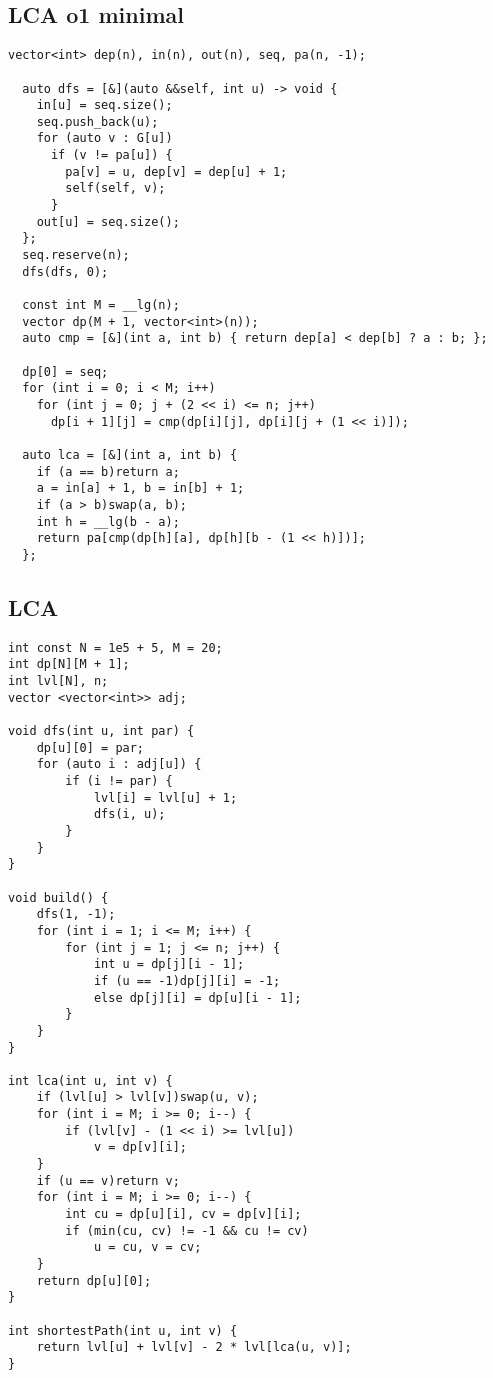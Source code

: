 \subsection{LCA o1 minimal}

\begin{lstlisting}[style=cpp]
  vector<int> dep(n), in(n), out(n), seq, pa(n, -1);

  auto dfs = [&](auto &&self, int u) -> void {
	in[u] = seq.size();
	seq.push_back(u);
	for (auto v : G[u])
	  if (v != pa[u]) {
		pa[v] = u, dep[v] = dep[u] + 1;
		self(self, v);
	  }
	out[u] = seq.size();
  };
  seq.reserve(n);
  dfs(dfs, 0);

  const int M = __lg(n);
  vector dp(M + 1, vector<int>(n));
  auto cmp = [&](int a, int b) { return dep[a] < dep[b] ? a : b; };

  dp[0] = seq;
  for (int i = 0; i < M; i++)
	for (int j = 0; j + (2 << i) <= n; j++)
	  dp[i + 1][j] = cmp(dp[i][j], dp[i][j + (1 << i)]);

  auto lca = [&](int a, int b) {
	if (a == b)return a;
	a = in[a] + 1, b = in[b] + 1;
	if (a > b)swap(a, b);
	int h = __lg(b - a);
	return pa[cmp(dp[h][a], dp[h][b - (1 << h)])];
  };
\end{lstlisting}

\subsection{LCA}

\begin{lstlisting}[style=cpp]
int const N = 1e5 + 5, M = 20;
int dp[N][M + 1];
int lvl[N], n;
vector <vector<int>> adj;
 
void dfs(int u, int par) {
    dp[u][0] = par;
    for (auto i : adj[u]) {
        if (i != par) {
            lvl[i] = lvl[u] + 1;
            dfs(i, u);
        }
    }
}
 
void build() {
    dfs(1, -1);
    for (int i = 1; i <= M; i++) {
        for (int j = 1; j <= n; j++) {
            int u = dp[j][i - 1];
            if (u == -1)dp[j][i] = -1;
            else dp[j][i] = dp[u][i - 1];
        }
    }
}
 
int lca(int u, int v) {
    if (lvl[u] > lvl[v])swap(u, v);
    for (int i = M; i >= 0; i--) {
        if (lvl[v] - (1 << i) >= lvl[u])
            v = dp[v][i];
    }
    if (u == v)return v;
    for (int i = M; i >= 0; i--) {
        int cu = dp[u][i], cv = dp[v][i];  
		if (min(cu, cv) != -1 && cu != cv)  
		    u = cu, v = cv;
    }
    return dp[u][0];
}
 
int shortestPath(int u, int v) {
    return lvl[u] + lvl[v] - 2 * lvl[lca(u, v)];
}
\end{lstlisting}

